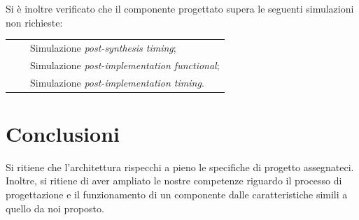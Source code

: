 \documentclass{article}
\newcommand{\tabitem}{~~\llap{\textbullet}~~}
\begin{document}
Si è inoltre verificato che il componente progettato supera le seguenti simulazioni non richieste:\par
\def\arraystretch{1.3} %
\begin{tabular}{m{8cm}}
    \tabitem Simulazione \emph{post-synthesis timing}; \\
    \tabitem Simulazione \emph{post-implementation functional}; \\
    \tabitem Simulazione \emph{post-implementation timing}. \\
\end{tabular}\vspace{1cm}

\section{Conclusioni}
Si ritiene che l’architettura rispecchi a pieno le specifiche di progetto assegnateci. Inoltre, si ritiene di aver ampliato le nostre competenze riguardo il processo di progettazione e il funzionamento di un componente dalle caratteristiche simili a quello da noi proposto.
\end{document}
